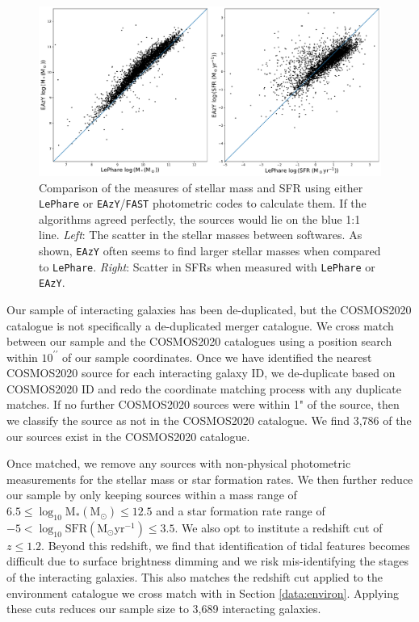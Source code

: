 \begin{figure}
\centering
\includegraphics[width=\textwidth]{Chapter3/figures/mass-sfr-scatter.pdf}
\caption[Comparison of the measures of stellar mass and SFR using either \texttt{LePhare} or \texttt{EAzY}/\texttt{FAST} photometric codes to calculate them.]{Comparison of the measures of stellar mass and SFR using either \texttt{LePhare} or \texttt{EAzY}/\texttt{FAST} photometric codes to calculate them. If the algorithms agreed perfectly, the sources would lie on the blue 1:1 line. \textit{Left}: The scatter in the stellar masses between softwares. As shown, \texttt{EAzY} often seems to find larger stellar masses when compared to \texttt{LePhare}. \textit{Right}: Scatter in SFRs when measured with \texttt{LePhare} or \texttt{EAzY}.}
\label{fig:difference-measures}
\end{figure}

Our sample of interacting galaxies has been de-duplicated, but the COSMOS2020 catalogue is not specifically a de-duplicated merger catalogue. We cross match between our sample and the COSMOS2020 catalogues using a position search within $10^{\prime\prime}$ of our sample coordinates. Once we have identified the nearest COSMOS2020 source for each interacting galaxy ID, we de-duplicate based on COSMOS2020 ID and redo the coordinate matching process with any duplicate matches. If no further COSMOS2020 sources were within 1" of the source, then we classify the source as not in the COSMOS2020 catalogue. We find 3,786 of the our sources exist in the COSMOS2020 catalogue.

Once matched, we remove any sources with non-physical photometric measurements for the stellar mass or star formation rates. We then further reduce our sample by only keeping sources within a mass range of $6.5 \leq \log_{10} \text{M}_{*}(\text{M}_{\odot}) \leq 12.5$ and a star formation rate range of $-5 < \log_{10} \text{SFR} (\text{M}_{\odot}\text{yr}^{-1}) \leq 3.5$. We also opt to institute a redshift cut of $z \leq 1.2$. Beyond this redshift, we find that identification of tidal features becomes difficult due to surface brightness dimming and we risk mis-identifying the stages of the interacting galaxies. This also matches the redshift cut applied to the environment catalogue we cross match with in Section \ref{data:environ}. Applying these cuts reduces our sample size to 3,689 interacting galaxies.

